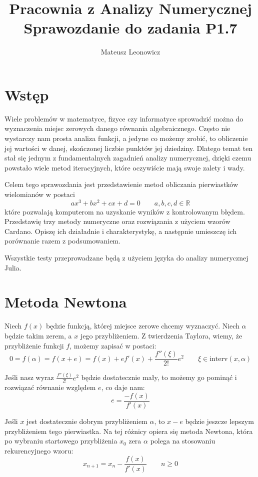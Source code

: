 \documentclass[a4paper]{article}
\title{\textbf{Pracownia z Analizy Numerycznej}\\{\Large Sprawozdanie do zadania P1.7}}
\author{Mateusz Leonowicz}
\begin{document}
\maketitle

\section{Wstęp}
    Wiele problemów w matematyce, fizyce czy informatyce sprowadzić można do wyznaczenia miejsc
    zerowych danego równania algebraicznego. Często nie wystarczy nam prosta analiza funkcji, a
    jedyne co możemy zrobić, to obliczenie jej wartości w danej, skończonej liczbie punktów jej dziedziny.
    Dlatego temat ten stał się jednym z fundamentalnych zagadnień analizy numerycznej, dzięki czemu
    powstało wiele metod iteracyjnych, które oczywiście mają swoje zalety i wady.
    
    \vspace{5mm}

    Celem tego sprawozdania jest przedstawienie metod obliczania pierwiastków wielomianów w postaci
    \[ax^3 + bx^2 + cx + d = 0 \qquad a, b, c, d \in \mathbb{R}\]
    które pozwalają komputerom na uzyskanie wyników z kontrolowanym błędem. Przedstawię trzy metody numeryczne oraz 
    rozwiązania z użyciem wzorów Cardano. Opiszę ich działadnie i charakterystykę, a następnie umieszczę ich porównanie
    razem z podsumowaniem.

    Wszystkie testy przeprowadzane będą z użyciem języka do analizy numerycznej Julia.
    
\tableofcontents

\newpage
\section{Metoda Newtona}
    Niech $f(x)$ będzie funkcją, której miejsce zerowe chcemy wyznaczyć. Niech $\alpha$ będzie takim zerem, a $x$
    jego przybliżeniem. Z twierdzenia Taylora, wiemy, że przybliżenie funkcji $f$, możemy zapisać w postaci:
    \[
        0 = f(\alpha) = f(x + e) = f(x) + ef'(x) + \frac{f''(\xi)}{2!}e^2 \qquad \xi \in \text{interv}(x, \alpha) 
    \tag{1}\]

    Jeśli nasz wyraz $\frac{f''(\xi)}{2!}e^2$ będzie dostatecznie mały, to możemy go pominąć i rozwiązać równanie 
    względem $e$, co daje nam:
    \[
        e = \frac{-f(x)}{f'(x)}  
    \]

    Jeśli $x$ jest dostatecznie dobrym przybliżeniem $\alpha$, to $x - e$ będzie jeszcze lepszym przybliżeniem tego
    pierwiastka. Na tej różnicy opiera się metoda Newtona, która po wybraniu startowego przybliżenia $x_0$ zera $\alpha$
    polega na stosowaniu rekurencyjnego wzoru:
    \[
        x_{n+1} = x_n - \frac{f(x)}{f'(x)} \qquad n \geq 0
    \tag{2}\]
\end{document}
